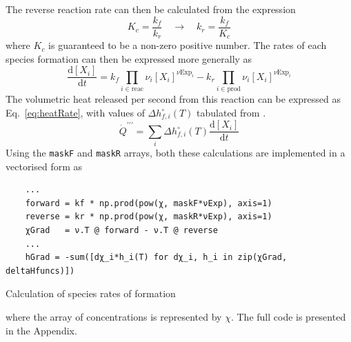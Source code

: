 \documentclass[a4paper]{article}
\begin{document}
The reverse reaction rate can then be calculated from the expression
\begin{equation}
	\label{eq:reverseReactionRate}
	K_c = \frac{k_f}{k_r} \quad \longrightarrow \quad
	k_r = \frac{k_f}{K_c}
\end{equation}
where \(K_c\) is guaranteed to be a non-zero positive number. The rates of each
species formation can then be expressed more generally as
\begin{equation}
	\label{eq:generalRates}
	\frac{\mathrm{d}[X_i]}{\mathrm{d}t}
	= k_f \prod_{i\in\text{reac}} \nu_i [X_i]^{\nu\text{Exp}_i}
	- k_r \prod_{i\in\text{prod}} \nu_i [X_i]^{\nu\text{Exp}_i}
\end{equation}
The volumetric
heat released per second from this reaction can be expressed as
Eq.~\ref{eq:heatRate}, with values of \(\Delta h_{f,i}^\circ (T)\) tabulated
from \cite{NIST}.
\begin{equation}
	\label{eq:heatRate}
	\dot{Q}^{\prime\prime\prime}
	= \sum_i \Delta h_{f,i}^\circ (T) \frac{\mathrm{d}[X_i]}{\mathrm{d}t}
\end{equation}
Using the \texttt{maskF} and \texttt{maskR} arrays, both these calculations are
implemented in a vectorised form as
\begin{listing}[H]
	\centering
	\begin{minipage}{\linewidth}
		\begin{verbatim}
	...
	forward = kf * np.prod(pow(χ, maskF*νExp), axis=1)
	reverse = kr * np.prod(pow(χ, maskR*νExp), axis=1)
	χGrad   = ν.T @ forward - ν.T @ reverse
	...
	hGrad = -sum([dχ_i*h_i(T) for dχ_i, h_i in zip(χGrad, deltaHfuncs)])
		\end{verbatim}
	\end{minipage}
	\caption{Calculation of species rates of formation}
	\label{lst:speciesRate}
\end{listing}
where the array of concentrations is represented by \(\chi\). The full code is
presented in the Appendix.
\end{document}
